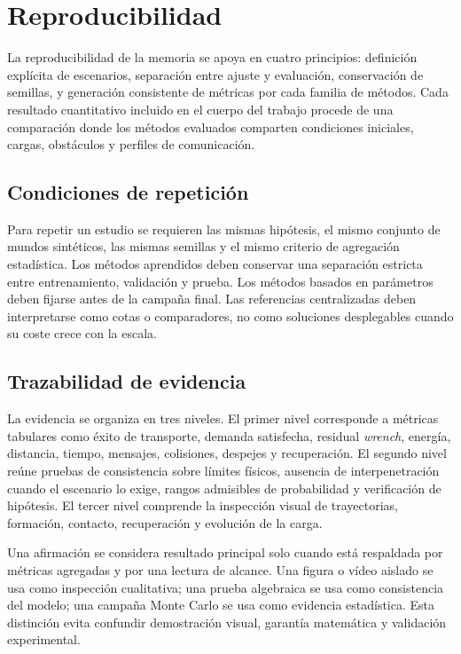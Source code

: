 \section{Reproducibilidad}
\label{sec:reproducibilidad}
\begingroup
\small

La reproducibilidad de la memoria se apoya en cuatro principios: definición explícita de escenarios, separación entre ajuste y evaluación, conservación de semillas, y generación consistente de métricas por cada familia de métodos. Cada resultado cuantitativo incluido en el cuerpo del trabajo procede de una comparación donde los métodos evaluados comparten condiciones iniciales, cargas, obstáculos y perfiles de comunicación.

\subsection*{Condiciones de repetición}

Para repetir un estudio se requieren las mismas hipótesis, el mismo conjunto de mundos sintéticos, las mismas semillas y el mismo criterio de agregación estadística. Los métodos aprendidos deben conservar una separación estricta entre entrenamiento, validación y prueba. Los métodos basados en parámetros deben fijarse antes de la campaña final. Las referencias centralizadas deben interpretarse como cotas o comparadores, no como soluciones desplegables cuando su coste crece con la escala.

\subsection*{Trazabilidad de evidencia}

La evidencia se organiza en tres niveles. El primer nivel corresponde a métricas tabulares como éxito de transporte, demanda satisfecha, residual \emph{wrench}, energía, distancia, tiempo, mensajes, colisiones, despejes y recuperación. El segundo nivel reúne pruebas de consistencia sobre límites físicos, ausencia de interpenetración cuando el escenario lo exige, rangos admisibles de probabilidad y verificación de hipótesis. El tercer nivel comprende la inspección visual de trayectorias, formación, contacto, recuperación y evolución de la carga.

Una afirmación se considera resultado principal solo cuando está respaldada por métricas agregadas y por una lectura de alcance. Una figura o vídeo aislado se usa como inspección cualitativa; una prueba algebraica se usa como consistencia del modelo; una campaña Monte Carlo se usa como evidencia estadística. Esta distinción evita confundir demostración visual, garantía matemática y validación experimental.


